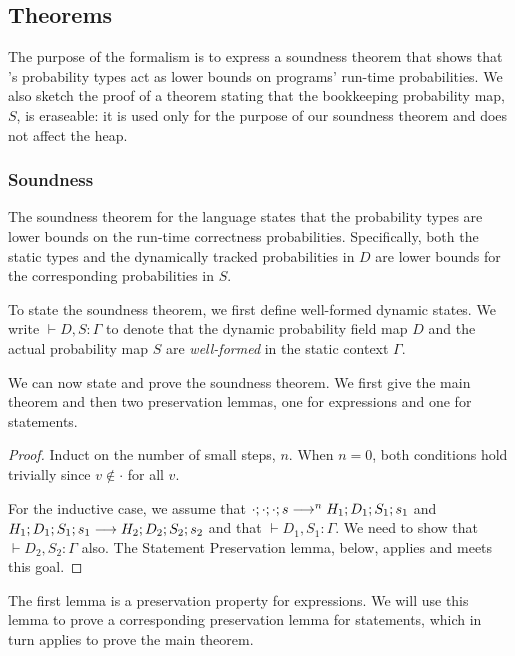 {\subsection{Theorems}

The purpose of the formalism is to express a soundness theorem that shows that
\lang's probability types act as lower bounds on programs' run-time
probabilities.
We also sketch the proof of a theorem stating that the bookkeeping probability map, $S$,
is eraseable: it is used only for the purpose of our soundness theorem and
does not affect the heap.

\subsubsection{Soundness}

The soundness theorem for the language states that the probability types are
lower bounds on the run-time correctness probabilities.
Specifically, both the static types  and the dynamically tracked
probabilities in $D$ are lower bounds for the corresponding probabilities in
$S$.

To state the soundness theorem, we first define well-formed dynamic states.
We write
$\vdash D, S : \Gamma$
to denote that the dynamic probability field map $D$
and the actual probability map $S$
are \emph{well-formed} in the static context $\Gamma$.



We can now state and prove the soundness theorem. We first give the main
theorem and then two
preservation lemmas, one for expressions and one for statements.



\begin{proof}
Induct on the number of small steps, $n$.
When $n = 0$, both conditions hold trivially since $v \notin \cdot$ for all
$v$.

For the inductive case, we assume that
$\cdot ; \cdot ; \cdot ; s \longrightarrow^n
H_1 ; D_1; S_1; s_1$
and
$H_1 ; D_1 ; S_1 ; s_1 \longrightarrow
H_2 ; D_2 ; S_2 ; s_2$
and that
$\vdash D_1, S_1 : \Gamma$.
We need to show that
$\vdash D_2, S_2 : \Gamma$ also.
The Statement Preservation lemma, below, applies and meets this goal.
\end{proof}

The first lemma is a preservation property for expressions. We will use this
lemma to prove a corresponding preservation lemma for statements, which in turn applies to
prove the main theorem.

}
